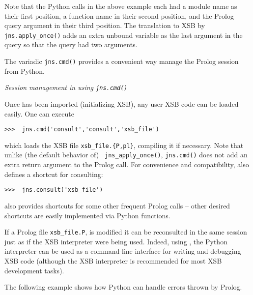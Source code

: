 Note that the Python calls in the above example each had a module name
as their first position, a function name in their second position, and
the Prolog query argument in their third position.  The translation to
XSB by {\tt jns.apply\_once()} adds an extra unbound variable as the
last argument in the query so that the query had two arguments.

The variadic {\tt jns.cmd()} provides a convenient way manage the
Prolog session from Python.  

\begin{example} \rm {\it Session management in \januspy{} using {\tt jns.cmd()}} \label{ex:jns-cmd}

  Once \januspy{} has been imported (initializing XSB), any user XSB
  code can be loaded easily.  One can execute
  
\begin{verbatim}
>>>  jns.cmd('consult','consult','xsb_file')
\end{verbatim}

\noindent
which loads the XSB file {\tt xsb\_file.\{P,pl\}}, compiling it if
necessary.  Note that unlike (the default behavior of) {\tt
  jns\_apply\_once()}, {\tt jns.cmd()} does not add an extra return
argument to the Prolog call.  For convenience and compatibility,
\januspy{} also defines a shortcut for consulting:

\begin{verbatim}
>>>  jns.consult('xsb_file')
\end{verbatim}

\noindent
\januspy{} also provides shortcuts for some other frequent Prolog calls
-- other desired shortcuts are easily implemented via Python
functions.

If a Prolog file {\tt xsb\_file.P}, is modified it can be reconsulted
in the same session just as if the XSB interpreter were being used.
Indeed, using \januspy{}, the Python interpreter can be used as a
command-line interface for writing and debugging XSB code (although
the XSB interpreter is recommended for most XSB development tasks).
\end{example}

The following example shows how Python can handle errors thrown by
Prolog.

